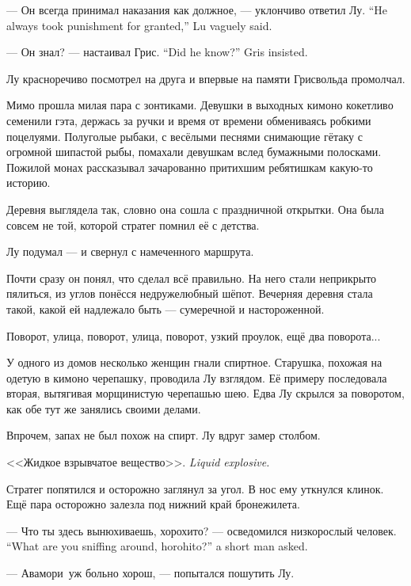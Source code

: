{--- Он всегда принимал наказания как должное, --- уклончиво ответил Лу.}
{``He always took punishment for granted,'' Lu vaguely said.}

{--- Он знал? --- настаивал Грис.}
{``Did he know?'' Gris insisted.}

Лу красноречиво посмотрел на друга и впервые на памяти Грисвольда промолчал.

Мимо прошла милая пара с зонтиками.
Девушки в выходных кимоно кокетливо семенили гэта, держась за ручки и время от времени обмениваясь робкими поцелуями.
Полуголые рыбаки, с весёлыми песнями снимающие гётаку\FM{} с огромной шипастой рыбы, помахали девушкам вслед бумажными полосками.
Пожилой монах рассказывал зачарованно притихшим ребятишкам какую-то историю.

Деревня выглядела так, словно она сошла с праздничной открытки.
Она была совсем не той, которой стратег помнил её с детства.

Лу подумал --- и свернул с намеченного маршрута.

Почти сразу он понял, что сделал всё правильно.
На него стали неприкрыто пялиться, из углов понёсся недружелюбный шёпот.
Вечерняя деревня стала такой, какой ей надлежало быть --- сумеречной и настороженной.

Поворот, улица, поворот, улица, поворот, узкий проулок, ещё два поворота...

У одного из домов несколько женщин гнали спиртное.
Старушка, похожая на одетую в кимоно черепашку, проводила Лу взглядом.
Её примеру последовала вторая, вытягивая морщинистую черепашью шею.
Едва Лу скрылся за поворотом, как обе тут же занялись своими делами.

Впрочем, запах не был похож на спирт.
Лу вдруг замер столбом.

{<<Жидкое взрывчатое вещество>>.}
{\emph{Liquid explosive.}}

Стратег попятился и осторожно заглянул за угол.
В нос ему уткнулся клинок.
Ещё пара осторожно залезла под нижний край бронежилета.

{--- Что ты здесь вынюхиваешь, хорохито? --- осведомился низкорослый человек.}
{``What are you sniffing around, horohito?'' a short man asked.}

--- Авамори\FM\ уж больно хорош, --- попытался пошутить Лу.

